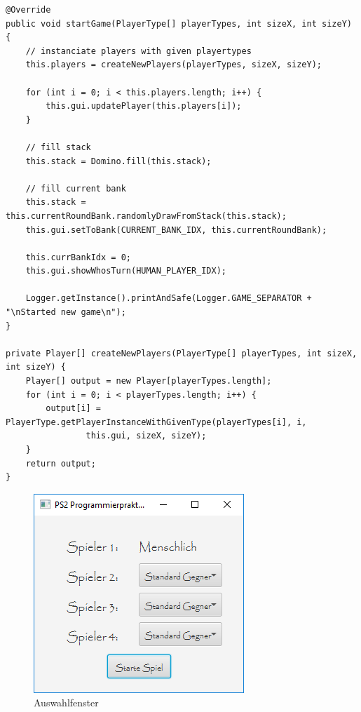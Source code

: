 \begin{lstlisting}[float,style=CodeHighlighting,caption=Game - startGame,label=game_startGame]
@Override
public void startGame(PlayerType[] playerTypes, int sizeX, int sizeY) {
    // instanciate players with given playertypes
    this.players = createNewPlayers(playerTypes, sizeX, sizeY);

    for (int i = 0; i < this.players.length; i++) {
        this.gui.updatePlayer(this.players[i]);
    }

    // fill stack
    this.stack = Domino.fill(this.stack);

    // fill current bank
    this.stack = this.currentRoundBank.randomlyDrawFromStack(this.stack);
    this.gui.setToBank(CURRENT_BANK_IDX, this.currentRoundBank);

    this.currBankIdx = 0;
    this.gui.showWhosTurn(HUMAN_PLAYER_IDX);

    Logger.getInstance().printAndSafe(Logger.GAME_SEPARATOR + "\nStarted new game\n");
}

private Player[] createNewPlayers(PlayerType[] playerTypes, int sizeX, int sizeY) {
    Player[] output = new Player[playerTypes.length];
    for (int i = 0; i < playerTypes.length; i++) {
        output[i] = PlayerType.getPlayerInstanceWithGivenType(playerTypes[i], i, 
        		this.gui, sizeX, sizeY);
    }
    return output;
}
\end{lstlisting}

\begin{figure}
	\centering
	\includegraphics[width=.4\linewidth]{pics/Intro240918}
	\caption[Auswahlfenster]{Auswahlfenster}
	\label{fig:auswahlfenster}
\end{figure}

